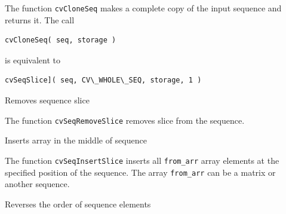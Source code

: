 The function \texttt{cvCloneSeq} makes a complete copy of the input sequence and returns it. The call

\begin{lstlisting}
cvCloneSeq( seq, storage )
\end{lstlisting}

is equivalent to

\begin{lstlisting}
cvSeqSlice]( seq, CV\_WHOLE\_SEQ, storage, 1 )
\end{lstlisting}

\label{SeqRemoveSlice}

Removes sequence slice


\begin{description}
\end{description}


The function \texttt{cvSeqRemoveSlice} removes slice from the sequence.

\label{SeqInsertSlice}

Inserts array in the middle of sequence


\begin{description}
\end{description}


The function \texttt{cvSeqInsertSlice} inserts all \texttt{from\_arr}
array elements at the specified position of the sequence. The array
\texttt{from\_arr} can be a matrix or another sequence.

\label{SeqInvert}

Reverses the order of sequence elements


